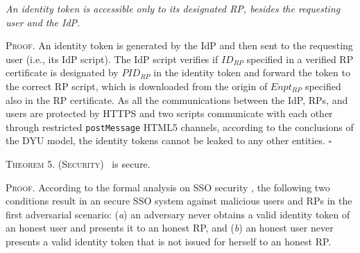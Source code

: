 \vspace{3mm}
 {\em An identity token is accessible only to its designated RP, besides the requesting user and the IdP.}

\vspace{0.75mm}
\noindent\textsc{Proof.}
An identity token is generated by the IdP and then sent to the requesting user (i.e., its IdP script).
The IdP script verifies if $ID_{RP}$ specified in a verified RP certificate is designated by $PID_{RP}$ in the identity token and forward the token to the correct RP script, which is downloaded from the origin of $Enpt_{RP}$ specified also in the RP certificate. %
As all the communications between the IdP, RPs, and users are protected by HTTPS and two scripts communicate with each other through restricted \verb+postMessage+ HTML5 channels, according to the conclusions of the DYU model, the identity tokens cannot be leaked to any other entities. \hfill $\square$


\vspace{3mm}
\noindent\textsc{Theorem 5. (Security)} {\usso~is secure.}

\vspace{0.75mm}
\noindent\textsc{Proof.}
According to the formal analysis on SSO security \cite{SPRESSO, FettKS14},
 the following two conditions result in an secure SSO system against malicious users and RPs in the first adversarial scenario: (\emph{a}) an adversary never obtains a valid identity token of an honest user and presents it to an honest RP, and (\emph{b}) an honest user never presents a valid identity token that is not issued for herself to an honest RP.


